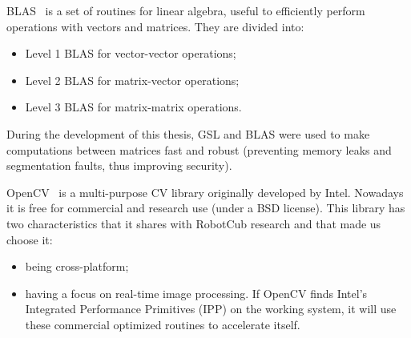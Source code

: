 \ac{BLAS}~\cite{link:blas} is a set of routines for linear algebra, useful to efficiently perform operations with vectors and matrices. They are divided into:
\begin{itemize}
\item Level 1 \ac{BLAS} for vector-vector operations;

\item Level 2 \ac{BLAS} for matrix-vector operations;

\item Level 3 \ac{BLAS} for matrix-matrix operations.
\end{itemize}

During the development of this thesis, \ac{GSL} and \ac{BLAS} were used to make computations between matrices fast and robust (preventing memory leaks and segmentation faults, thus improving security).

OpenCV~\cite{link:opencv} is a multi-purpose \ac{CV} library originally developed by Intel. Nowadays it is free for commercial and research use (under a BSD license). This library has two characteristics that it shares with \ac{RobotCub} research and that made us choose it:
\begin{itemize}
\item being cross-platform;

\item having a focus on real-time image processing. If OpenCV finds Intel's Integrated Performance Primitives (IPP) on the working system, it will use these commercial optimized routines to accelerate itself.
\end{itemize}